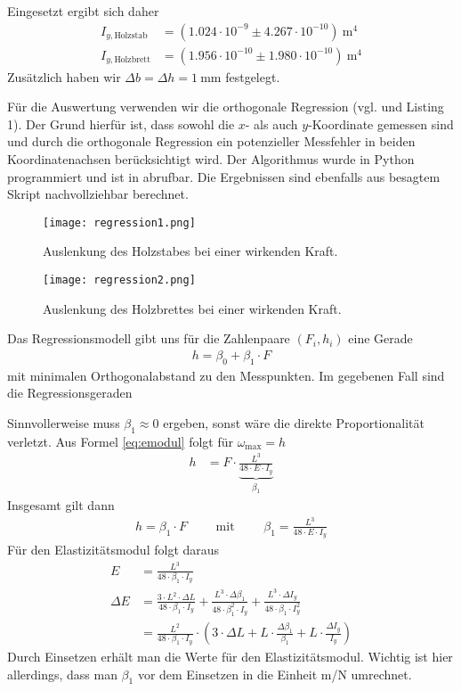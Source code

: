 \documentclass{article}
\begin{document}
Eingesetzt ergibt sich daher 
\begin{align*}
I_{y,\text{Holzstab}} &= (1.024\cdot 10^{-9} \pm 4.267\cdot 10^{-10})~\text{m}^4 \\
I_{y,\text{Holzbrett}} &= (1.956\cdot 10^{-10} \pm 1.980\cdot 10^{-10})~\text{m}^4
\end{align*}
Zusätzlich haben wir $\Delta b = \Delta h = 1~$mm festgelegt.


Für die Auswertung verwenden wir die orthogonale Regression (vgl. \cite{regr} und Listing 1). Der Grund hierfür ist, dass sowohl die $x$- als auch $y$-Koordinate gemessen sind und durch die orthogonale Regression ein potenzieller Messfehler in beiden Koordinatenachsen berücksichtigt wird. Der Algorithmus wurde in Python programmiert und ist in \cite{script} abrufbar. Die Ergebnissen sind ebenfalls aus besagtem Skript nachvollziehbar berechnet.


\begin{figure}[H]
\texttt{[image: regression1.png]}
\caption{Auslenkung des Holzstabes bei einer wirkenden Kraft.}
\end{figure}
\begin{figure}[H]
\texttt{[image: regression2.png]}
\caption{Auslenkung des Holzbrettes bei einer wirkenden Kraft.}
\end{figure}

Das Regressionsmodell gibt uns für die Zahlenpaare $(F_i, h_i)$ eine Gerade
\begin{align}
h =  \beta_0 + \beta_1\cdot F
\end{align}
mit minimalen Orthogonalabstand zu den Messpunkten. Im gegebenen Fall sind die Regressionsgeraden


 Sinnvollerweise muss $\beta_1 \approx 0$ ergeben, sonst wäre die direkte Proportionalität verletzt. Aus Formel \eqref{eq:emodul} folgt für $\omega_\text{max} = h$
\begin{align}
h &= F\cdot \underbrace{\frac{ L^3}{48\cdot E \cdot I_y}}_{\beta_1}
\end{align}
Insgesamt gilt dann
\begin{align}
h = \beta_1\cdot F \qquad \text{ mit } \qquad \beta_1 = \frac{L^3}{48\cdot E \cdot I_y}
\end{align}
Für den Elastizitätsmodul folgt daraus
\begin{align}
E &= \frac{L^3}{48\cdot \beta_1 \cdot I_y} \\
\Delta E &= \frac{3\cdot L^2\cdot \Delta L}{48\cdot \beta_1 \cdot I_y} + \frac{L^3\cdot \Delta \beta_1}{48\cdot \beta_1^2 \cdot I_y} + \frac{L^3\cdot \Delta I_y}{48\cdot \beta_1 \cdot I_y^2} \\
&= \frac{L^2}{48\cdot \beta_1\cdot I_y} \cdot \left( 3\cdot \Delta L + L\cdot\frac{\Delta\beta_1}{\beta_1} + L\cdot \frac{\Delta I_y}{I_y}\right)
\end{align}
Durch Einsetzen erhält man die Werte für den Elastizitätsmodul. Wichtig ist hier allerdings, dass man $\beta_1$ vor dem Einsetzen in die Einheit m/N umrechnet. 
\end{document}
